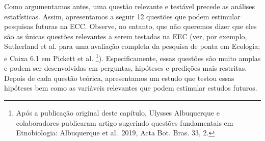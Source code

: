 \documentclass[
]{book}
\begin{document}
Como argumentamos antes, uma questão relevante e testável precede as análises estatísticas. Assim, apresentamos a seguir 12 questões que podem estimular pesquisas futuras na ECC. Observe, no entanto, que não queremos dizer que eles são as únicas questões relevantes a serem testadas na EEC (ver, por exemplo, Sutherland et al. \citeyearpar{sutherland_identification_2013} para uma avaliação completa da pesquisa de ponta em Ecologia; e Caixa 6.1 em Pickett et al. \citeyearpar{pickett_ecological_2007}\footnote{Após a publicação original deste capítulo, Ulysses Albuquerque e colaboradores publicaram artigo sugerindo questões fundamentais em Etnobiologia: Albuquerque et al.~2019, Acta Bot. Bras. 33, 2.}). Especificamente, essas questões são muito amplas e podem ser desenvolvidas em perguntas, hipóteses e predições mais restritas. Depois de cada questão teórica, apresentamos um estudo que testou essas hipóteses bem como as variáveis relevantes que podem estimular estudos futuros.
\end{document}
